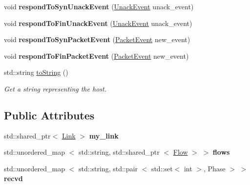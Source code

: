 \begin{DoxyCompactItemize}
\item 
\hypertarget{classHost_a13a11214f204347c85388b28043459c2}{void {\bfseries respond\-To\-Syn\-Unack\-Event} (\hyperlink{classUnackEvent}{\-Unack\-Event} unack\-\_\-event)}\label{classHost_a13a11214f204347c85388b28043459c2}

\item 
\hypertarget{classHost_a9f76466a0f9e8362f70c7990eae22641}{void {\bfseries respond\-To\-Fin\-Unack\-Event} (\hyperlink{classUnackEvent}{\-Unack\-Event} unack\-\_\-event)}\label{classHost_a9f76466a0f9e8362f70c7990eae22641}

\item 
\hypertarget{classHost_a55abc101a34bd2bc1aff724883a85ecc}{void {\bfseries respond\-To\-Syn\-Packet\-Event} (\hyperlink{classPacketEvent}{\-Packet\-Event} new\-\_\-event)}\label{classHost_a55abc101a34bd2bc1aff724883a85ecc}

\item 
\hypertarget{classHost_a6f3523a2e00b6aae6f5e9fa14b0f0e0f}{void {\bfseries respond\-To\-Fin\-Packet\-Event} (\hyperlink{classPacketEvent}{\-Packet\-Event} new\-\_\-event)}\label{classHost_a6f3523a2e00b6aae6f5e9fa14b0f0e0f}

\item 
std\-::string \hyperlink{classHost_aa807c50f690bd2018265504483440c7d}{to\-String} ()
\begin{DoxyCompactList}\small\item\em \-Get a string representing the host. \end{DoxyCompactList}\end{DoxyCompactItemize}
\subsection*{\-Public \-Attributes}
\begin{DoxyCompactItemize}
\item 
\hypertarget{classHost_a6b880d3ae2688e05f0617de4c247b84c}{std\-::shared\-\_\-ptr$<$ \hyperlink{classLink}{\-Link} $>$ {\bfseries my\-\_\-link}}\label{classHost_a6b880d3ae2688e05f0617de4c247b84c}

\item 
\hypertarget{classHost_a27e0ce48916f5882e8916f96ec1a6b1f}{std\-::unordered\-\_\-map\*
$<$ std\-::string, std\-::shared\-\_\-ptr\*
$<$ \hyperlink{classFlow}{\-Flow} $>$ $>$ {\bfseries flows}}\label{classHost_a27e0ce48916f5882e8916f96ec1a6b1f}

\item 
\hypertarget{classHost_a8e5905756bdacfb89df56f6bcb29d7ff}{std\-::unordered\-\_\-map\*
$<$ std\-::string, std\-::pair\*
$<$ std\-::set$<$ int $>$, \-Phase $>$ $>$ {\bfseries recvd}}\label{classHost_a8e5905756bdacfb89df56f6bcb29d7ff}

\end{DoxyCompactItemize}


